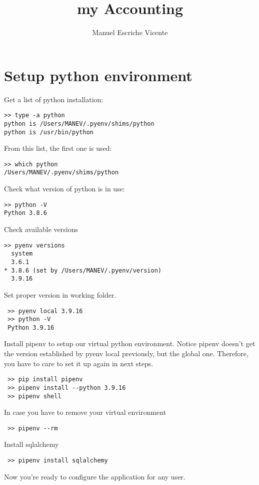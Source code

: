 \documentclass[12pt, a4paper]{article}
\title{my Accounting}
\author{Manuel Escriche Vicente}
\begin{document}
\maketitle
\begin{abstract}

\end{abstract}
\tableofcontents
\newpage

\section{Setup python environment}
Get a list of python installation:
\begin{verbatim}
>> type -a python
python is /Users/MANEV/.pyenv/shims/python
python is /usr/bin/python
\end{verbatim}
From this list, the first one is used:
\begin{verbatim}
>> which python
/Users/MANEV/.pyenv/shims/python
\end{verbatim}
Check what version of python is in use:
\begin{verbatim}
>> python -V
Python 3.8.6
\end{verbatim}
Check available versions
\begin{verbatim}
>> pyenv versions
  system
  3.6.1
* 3.8.6 (set by /Users/MANEV/.pyenv/version)
  3.9.16
\end{verbatim}
Set proper version in working folder.  
\begin{verbatim}
 >> pyenv local 3.9.16
 >> python -V 
 Python 3.9.16
 \end{verbatim}
 Install pipenv to setup our virtual python environment. Notice pipenv doesn't get the version established by pyenv local previously, but the global one. Therefore, you have to care to set it up again in next steps.
 \begin{verbatim}
 >> pip install pipenv
 >> pipenv install --python 3.9.16
 >> pipenv shell
 \end{verbatim}
 In case you have to remove your virtual environment 
 \begin{verbatim}
 >> pipenv --rm
 \end{verbatim}
 Install sqlalchemy
 \begin{verbatim}
 >> pipenv install sqlalchemy
 \end{verbatim}
 Now you're ready to configure the application for any user.
 
 
\end{document}
